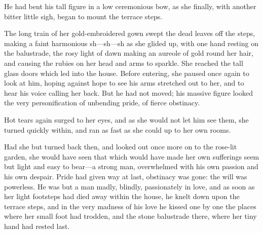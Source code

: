 He had bent his tall figure in a low ceremonious bow, as she finally, with another bitter little sigh, began to mount the terrace steps.

The long train of her gold-embroidered gown swept the dead leaves off the steps, making a faint harmonious sh—sh—sh as she glided up, with one hand resting on the balustrade, the rosy light of dawn making an aureole of gold round her hair, and causing the rubies on her head and arms to sparkle. She reached the tall glass doors which led into the house. Before entering, she paused once again to look at him, hoping against hope to see his arms stretched out to her, and to hear his voice calling her back. But he had not moved; his massive figure looked the very personification of unbending pride, of fierce obstinacy.

Hot tears again surged to her eyes, and as she would not let him see them, she turned quickly within, and ran as fast as she could up to her own rooms.

Had she but turned back then, and looked out once more on to the rose-lit garden, she would have seen that which would have made her own sufferings seem but light and easy to bear—a strong man, overwhelmed with his own passion and his own despair. Pride had given way at last, obstinacy was gone: the will was powerless. He was but a man madly, blindly, passionately in love, and as soon as her light footsteps had died away within the house, he knelt down upon the terrace steps, and in the very madness of his love he kissed one by one the places where her small foot had trodden, and the stone balustrade there, where her tiny hand had rested last.